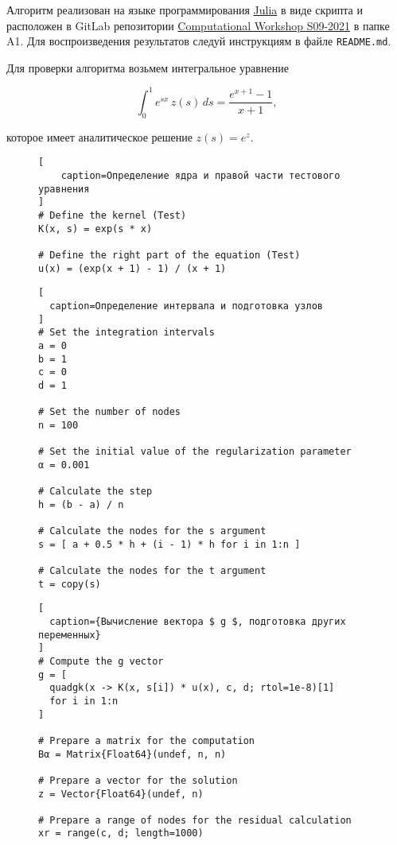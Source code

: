 Алгоритм реализован на языке программирования \href{https://julialang.org/}{Julia} в виде скрипта и расположен в GitLab репозитории \href{https://gitlab.com/paveloom-g/university/computational-workshop-s09-2021}{Computational Workshop S09-2021} в папке A1. Для воспроизведения результатов следуй инструкциям в файле {\footnotesize \texttt{README.md}}. \npar

Для проверки алгоритма возьмем интегральное уравнение

\begin{equation}
  \int_0^1 e^{sx} \, z(s) \, ds = \frac{e^{x+1} - 1}{x + 1},
\end{equation}

которое имеет аналитическое решение $ z(s) = e^z $.

\newpage

\captionsetup{singlelinecheck=false, justification=justified}

\begin{figure}[h!]
\begin{lstlisting}[
    caption=Определение ядра и правой части тестового уравнения
]
# Define the kernel (Test)
K(x, s) = exp(s * x)

# Define the right part of the equation (Test)
u(x) = (exp(x + 1) - 1) / (x + 1)
\end{lstlisting}
\end{figure}

\begin{figure}[h!]
\begin{lstlisting}[
  caption=Определение интервала и подготовка узлов
]
# Set the integration intervals
a = 0
b = 1
c = 0
d = 1

# Set the number of nodes
n = 100

# Set the initial value of the regularization parameter
α = 0.001

# Calculate the step
h = (b - a) / n

# Calculate the nodes for the s argument
s = [ a + 0.5 * h + (i - 1) * h for i in 1:n ]

# Calculate the nodes for the t argument
t = copy(s)
\end{lstlisting}
\end{figure}

\begin{figure}[h!]
\begin{lstlisting}[
  caption={Вычисление вектора $ g $, подготовка других переменных}
]
# Compute the g vector
g = [
  quadgk(x -> K(x, s[i]) * u(x), c, d; rtol=1e-8)[1]
  for i in 1:n
]

# Prepare a matrix for the computation
Bα = Matrix{Float64}(undef, n, n)

# Prepare a vector for the solution
z = Vector{Float64}(undef, n)

# Prepare a range of nodes for the residual calculation
xr = range(c, d; length=1000)
\end{lstlisting}
\end{figure}

